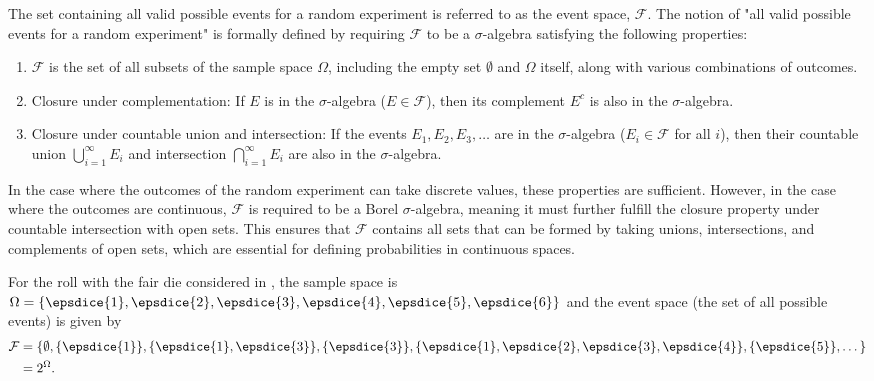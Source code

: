 \begin{definition}
	The set containing all valid possible events for a random experiment is referred to as the event space, $\mathcal{F}$. The notion of "all valid possible events for a random experiment" is formally defined by requiring $\mathcal{F}$ to be a $\sigma$-algebra satisfying the following properties:
	\begin{enumerate}
		\item $\mathcal{F}$ is the set of all subsets of the sample space $\Omega$, including the empty set $\emptyset$ and $\Omega$ itself, along with various combinations of outcomes.
		\item Closure under complementation: If $E$ is in the $\sigma$-algebra ($E \in \mathcal{F}$), then its complement $E^c$ is also in the $\sigma$-algebra.
		\item Closure under countable union and intersection: If the events $E_1, E_2, E_3, \dots$ are in the $\sigma$-algebra ($E_i \in \mathcal{F}$ for all $i$), then their countable union $\bigcup_{i=1}^{\infty} E_i$ and intersection $\bigcap_{i=1}^{\infty} E_i$ are also in the $\sigma$-algebra.
	\end{enumerate}
	In the case where the outcomes of the random experiment can take discrete values, these properties are sufficient. However, in the case where the outcomes are continuous, $\mathcal{F}$ is required to be a Borel $\sigma$-algebra, meaning it must further fulfill the closure property under countable intersection with open sets. This ensures that $\mathcal{F}$ contains all sets that can be formed by taking unions, intersections, and complements of open sets, which are essential for defining probabilities in continuous spaces.
\end{definition}


\begin{example}
	\label{ex:die2}
	For the roll with the fair die considered in , the sample space is $\Omega = \{ \epsdice{1}, \epsdice{2}, \epsdice{3}, \epsdice{4}, \epsdice{5}, \epsdice{6} \}$ and the event space (the set of all possible events) is given by
	\begin{equation}
		\begin{split}
			\mathcal{F}&=\{\emptyset, \{\epsdice{1}\},\{\epsdice{1},\epsdice{3}\},\{\epsdice{3}\},\{\epsdice{1},\epsdice{2},\epsdice{3},\epsdice{4}\},\{\epsdice{5}\},\dots\}\\
			& = 2^\Omega.
		\end{split}
	\end{equation}
\end{example}

